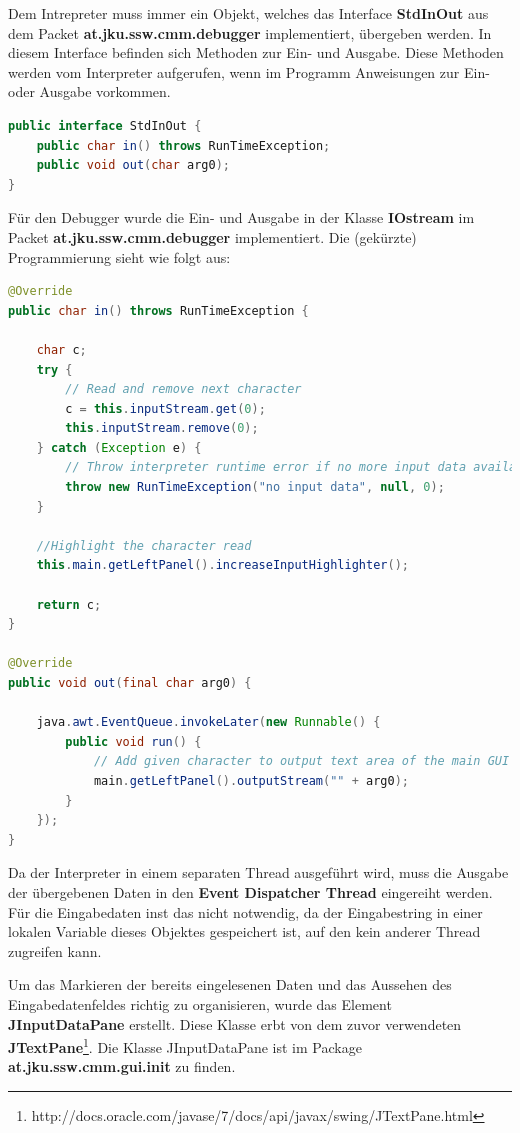 Dem Intrepreter muss immer ein Objekt, welches das Interface \textbf{StdInOut} aus dem Packet \textbf{at.jku.ssw.cmm.debugger} implementiert, übergeben werden. In diesem Interface befinden sich Methoden zur Ein- und Ausgabe. Diese Methoden werden vom Interpreter aufgerufen, wenn im Programm Anweisungen zur Ein- oder Ausgabe vorkommen.

\begin{lstlisting}[language=JAVA]
public interface StdInOut {
	public char in() throws RunTimeException;
	public void out(char arg0);
}
\end{lstlisting}

Für den Debugger wurde die Ein- und Ausgabe in der Klasse \textbf{IOstream} im Packet \textbf{at.jku.ssw.cmm.debugger} implementiert. Die (gekürzte) Programmierung sieht wie folgt aus:

\begin{lstlisting}[language=JAVA]
@Override
public char in() throws RunTimeException {

	char c;
	try {
		// Read and remove next character
		c = this.inputStream.get(0);
		this.inputStream.remove(0);
	} catch (Exception e) {
		// Throw interpreter runtime error if no more input data available
		throw new RunTimeException("no input data", null, 0);
	}
	
	//Highlight the character read
	this.main.getLeftPanel().increaseInputHighlighter();
	
	return c;
}

@Override
public void out(final char arg0) {

	java.awt.EventQueue.invokeLater(new Runnable() {
		public void run() {
			// Add given character to output text area of the main GUI
			main.getLeftPanel().outputStream("" + arg0);
		}
	});
}
\end{lstlisting}

Da der Interpreter in einem separaten Thread ausgeführt wird, muss die Ausgabe der übergebenen Daten in den \textbf{Event Dispatcher Thread} eingereiht werden. Für die Eingabedaten inst das nicht notwendig, da der Eingabestring in einer lokalen Variable dieses Objektes gespeichert ist, auf den kein anderer Thread zugreifen kann.

Um das Markieren der bereits eingelesenen Daten und das Aussehen des Eingabedatenfeldes richtig zu organisieren, wurde das Element \textbf{JInputDataPane} erstellt. Diese Klasse erbt von dem zuvor verwendeten \textbf{JTextPane}\footnote{http://docs.oracle.com/javase/7/docs/api/javax/swing/JTextPane.html}. Die Klasse JInputDataPane ist im Package \textbf{at.jku.ssw.cmm.gui.init} zu finden. 

